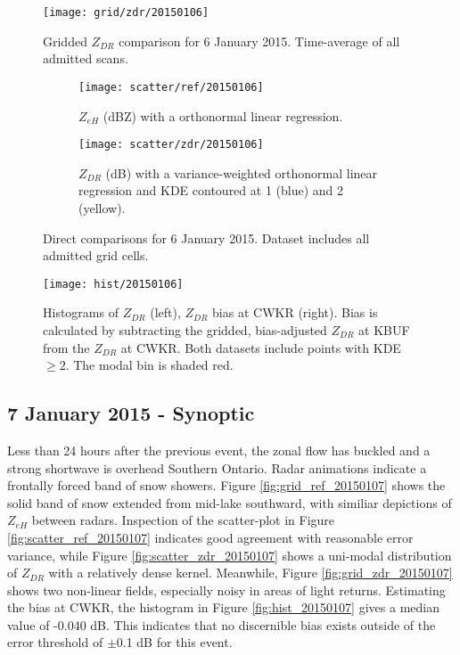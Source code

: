 \begin{figure}[H]
\texttt{[image: grid/zdr/20150106]}
\caption{Gridded $Z_{DR}$ comparison for 6 January 2015. Time-average of all admitted scans.} 
\label{fig:grid_zdr_20150106}
\end{figure}

\begin{figure}[H]
\centering
   \begin{subfigure}[t]{0.48\linewidth} \centering
     \texttt{[image: scatter/ref/20150106]}
     \caption{$Z_{eH}$ (dBZ) with a orthonormal linear regression.}\label{fig:scatter_ref_20150106}
   \end{subfigure}
   \begin{subfigure}[t]{0.48\linewidth} \centering
     \texttt{[image: scatter/zdr/20150106]}
     \caption{$Z_{DR}$ (dB) with a variance-weighted orthonormal linear regression and KDE contoured at 1 (blue) and 2 (yellow).}\label{fig:scatter_zdr_20150106}
   \end{subfigure}
\caption{Direct comparisons for 6 January 2015. Dataset includes all admitted grid cells.} \label{fig:scatter_20150106}
\end{figure}

\begin{figure}[H]
\texttt{[image: hist/20150106]}\centering
\caption{Histograms of $Z_{DR}$ (left), $Z_{DR}$ bias at CWKR (right). Bias is calculated by subtracting the gridded, bias-adjusted $Z_{DR}$ at KBUF from the
$Z_{DR}$ at CWKR. Both datasets include points with KDE $\geq 2$. The modal bin is shaded red.} 
\label{fig:hist_20150106}
\end{figure}

\subsection{7 January 2015 - Synoptic}
Less than 24 hours after the previous event, the zonal flow has buckled and a strong shortwave is overhead Southern Ontario. Radar animations indicate a
frontally forced band of snow showers. Figure \ref{fig:grid_ref_20150107} shows the solid band of snow extended from mid-lake southward, with similiar
depictions of $Z_{eH}$ between radars. Inspection of the scatter-plot in Figure \ref{fig:scatter_ref_20150107} indicates good agreement with reasonable error
variance, while Figure \ref{fig:scatter_zdr_20150107} shows a uni-modal distribution of $Z_{DR}$ with a relatively dense kernel.
Meanwhile, Figure \ref{fig:grid_zdr_20150107} shows two non-linear fields, especially noisy in areas of light returns. 
Estimating the bias at CWKR, the histogram in Figure \ref{fig:hist_20150107} gives a median value of -0.040 dB. This indicates that no discernible bias
exists outside of the error threshold of $\pm$0.1 dB for this event.

